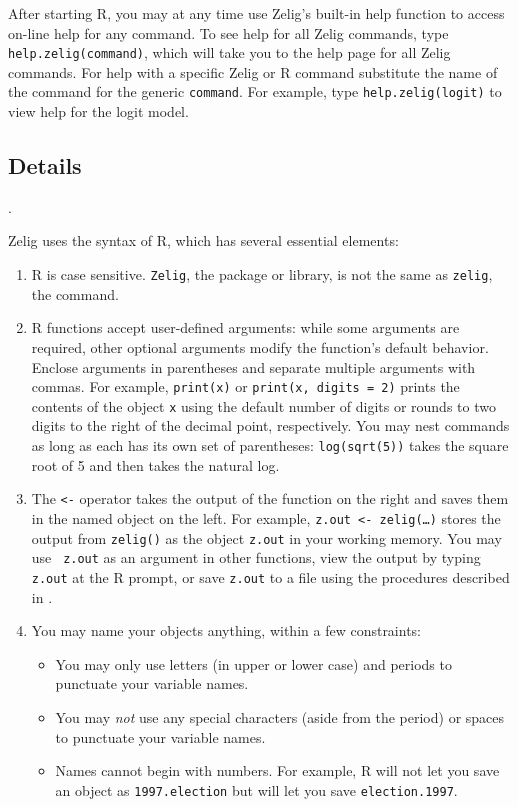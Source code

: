 After starting R, you may at any time use Zelig's built-in help
function to access on-line help for any command.  To see help for all
Zelig commands, type {\tt help.zelig(command)}, which will take you
to the help page for all Zelig commands.  For help with a specific
Zelig or R command substitute the name of the command for the generic
{\tt command}.  For example, type {\tt help.zelig(logit)} to view
help for the logit model.

\subsection{Details}\label{s:syntax}.

Zelig uses the syntax of R, which has several essential elements:
\begin{enumerate}
\item R is case sensitive.  \texttt{Zelig}, the package or library, is
  not the same as \texttt{zelig}, the command.
  
\item R functions accept user-defined arguments: while some arguments
  are required, other optional arguments modify the function's default
  behavior.  Enclose arguments in parentheses and separate multiple
  arguments with commas.  For example, {\tt print(x)} or {\tt print(x,
    digits = 2)} prints the contents of the object {\tt x} using the
  default number of digits or rounds to two digits to the right of the decimal
  point, respectively.  You may nest commands as long as each has its
  own set of parentheses: \texttt{log(sqrt(5))} takes the square root
  of 5 and then takes the natural log.
  
\item The {\tt <-} operator takes the output of the function on the
  right and saves them in the named object on the left.  For example,
  {\tt z.out <- zelig(\dots)} stores the output from {\tt zelig()} as
  the object {\tt z.out} in your working memory.  You may use {\tt
    z.out} as an argument in other functions, view the output by
  typing {\tt z.out} at the R prompt, or save {\tt z.out} to a file
  using the procedures described in .
  
\item You may name your objects anything, within a few constraints:
    \begin{itemize}
    \item You may only use letters (in upper or lower case) and
      periods to punctuate your variable names.
    \item You may \emph{not} use any special characters (aside from the
      period) or spaces to punctuate your variable names.
    \item Names cannot begin with numbers.  For example, R will not
      let you save an object as \texttt{1997.election} but will let
      you save \texttt{election.1997}.
    \end{itemize}
    

\end{enumerate}
